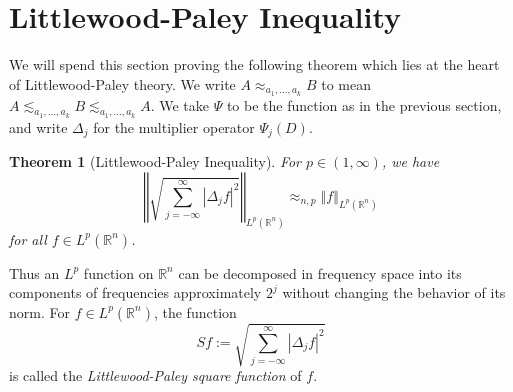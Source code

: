 \documentclass{book}
\newcommand{\bbR}{\mathbb{R}}
\newcommand{\abs}[1]{\left\lvert {#1} \right\rvert}
\newcommand{\norm}[1]{\left\Vert {#1} \right\Vert}
\newtheorem{theorem}{Theorem}[chapter]
\theoremstyle{definition}
\theoremstyle{remark}
\numberwithin{equation}{chapter}
\begin{document}
\section{Littlewood-Paley Inequality}

We will spend this section proving the following theorem which lies at the heart of Littlewood-Paley theory. We write $A \approx_{a_1,\dots,a_k} B$ to mean $A \lesssim_{a_1,\dots,a_k} B \lesssim_{a_1,\dots,a_k} A$. We take $\Psi$ to be the function as in the previous section, and write $\Delta_j$ for the multiplier operator $\Psi_j(D)$.
\begin{theorem}[Littlewood-Paley Inequality] \label{thm:littlePaley}
    For $p \in (1,\infty)$, we have 
    \begin{equation}
        \norm{ \sqrt{ \sum_{j=-\infty}^\infty \abs{\Delta_j f}^2 } }_{L^p(\bbR^n)}
        \approx_{n,p} \norm{f}_{L^p(\bbR^n)}
    \end{equation}
    for all $f \in L^p(\bbR^n)$.
\end{theorem}
Thus an $L^p$ function on $\bbR^n$ can be decomposed in frequency space into its components of frequencies approximately $2^j$ without changing the behavior of its norm. For $f \in L^p(\bbR^n)$, the function 
\begin{equation}
    Sf := \sqrt{ \sum_{j=-\infty}^\infty \abs{\Delta_j f}^2 }
\end{equation}
is called the \textit{Littlewood-Paley square function} of $f$.
\end{document}

